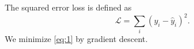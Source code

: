 The squared error loss is defined as
\begin{equation}
\mathcal{L} = \sum_i (y_i - \hat{y}_i)^2.
\label{eq:1}
\end{equation}
We minimize \eqref{eq:1} by gradient descent.
